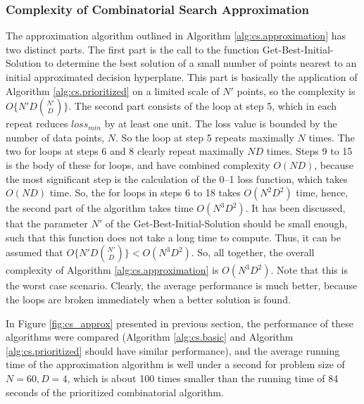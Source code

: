 \subsubsection{Complexity of Combinatorial Search Approximation}

The approximation algorithm outlined in Algorithm
\ref{alg:cs.approximation} has two distinct parts. The first part is
the call to the function {\sc Get-Best-Initial-Solution} to determine
the best solution of a small number of points nearest to an initial
approximated decision hyperplane. This part is basically the
application of Algorithm \ref{alg:cs.prioritized} on a limited scale
of $N'$ points, so the complexity is $O\{ N'D{N' \choose D} \}$. The
second part consists of the loop at step 5, which in each repeat
reduces $loss_{min}$ by at least one unit. The loss value is bounded
by the number of data points, $N$. So the loop at step 5 repeats
maximally $N$ times. The two for loops at steps 6 and 8 clearly repeat
maximally $ND$ times. Steps 9 to 15 is the body of these for loops,
and have combined complexity $O(ND)$, because the most significant
step is the calculation of the 0--1 loss function, which takes $O(ND)$
time. So, the for loops in steps 6 to 18 takes $O(N^2D^2)$ time,
hence, the second part of the algorithm takes time $O(N^3D^2)$. It has
been discussed, that the parameter $N'$ of the {\sc
  Get-Best-Initial-Solution} should be small enough, such that this
function does not take a long time to compute. Thus, it can be assumed
that $O\{ N'D{N' \choose D} \} < O(N^3D^2)$. So, all together, the
overall complexity of Algorithm \ref{alg:cs.approximation} is
$O(N^3D^2)$. Note that this is the worst case scenario. Clearly, the
average performance is much better, because the loops are broken
immediately when a better solution is found.

In Figure \ref{fig:cs_approx} presented in previous section, the
performance of these algorithms were compared (Algorithm
\ref{alg:cs.basic} and Algorithm \ref{alg:cs.prioritized} should have
similar performance), and the average running time of the
approximation algorithm is well under a second for problem size of
$N=60, D=4$, which is about 100 times smaller than the running time of
84 seconds of the prioritized combinatorial algorithm.

